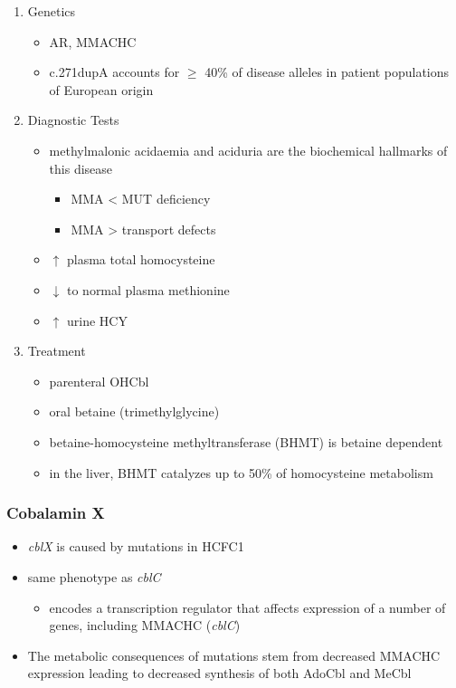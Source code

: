 \documentclass{scrartcl}
\begin{document}
\begin{enumerate}
\item Genetics
\label{sec:org27b4caa}
\begin{itemize}
\item AR, MMACHC
\item c.271dupA accounts for \(\ge\) 40\% of disease alleles in patient
populations of European origin
\end{itemize}

\item Diagnostic Tests
\label{sec:org0e6aec8}
\begin{itemize}
\item methylmalonic acidaemia and aciduria are the
biochemical hallmarks of this disease
\begin{itemize}
\item MMA \textless{} MUT deficiency
\item MMA \textgreater{} transport defects
\end{itemize}
\item \(\uparrow\) plasma total homocysteine
\item \(\downarrow\) to normal plasma methionine
\item \(\uparrow\) urine HCY
\end{itemize}

\item Treatment
\label{sec:org364b5c3}
\begin{itemize}
\item parenteral OHCbl
\item oral betaine (trimethylglycine)
\item betaine-homocysteine methyltransferase (BHMT) is betaine dependent
\end{itemize}
\begin{itemize}
\item in the liver, BHMT catalyzes up to 50\% of homocysteine metabolism
\end{itemize}
\end{enumerate}
\subsubsection{Cobalamin X}
\label{sec:orga86c702}
\begin{itemize}
\item \emph{cblX} is caused by mutations in HCFC1
\item same phenotype as \emph{cblC}
\begin{itemize}
\item encodes a transcription regulator that affects expression of a
number of genes, including MMACHC (\emph{cblC})
\end{itemize}
\item The metabolic consequences of mutations stem from decreased MMACHC
expression leading to decreased synthesis of both AdoCbl and MeCbl
\end{itemize}
\end{document}
